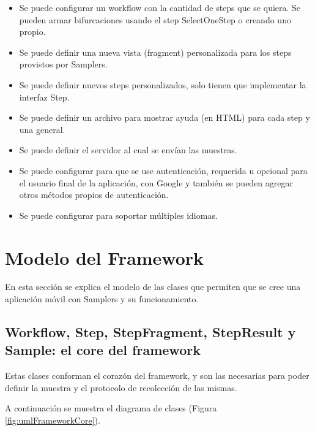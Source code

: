 \begin{itemize}
	\item Se puede configurar un workflow con la cantidad de steps que se quiera. Se pueden armar bifurcaciones usando el step SelectOneStep o creando uno propio.
	\item Se puede definir una nueva vista (fragment) personalizada para los steps provistos por Samplers.
	\item Se puede definir nuevos steps personalizados, solo tienen que implementar la interfaz Step.
	\item Se puede definir un archivo para mostrar ayuda (en HTML) para cada step y una general.
	\item Se puede definir el servidor al cual se envían las muestras.
	\item Se puede configurar para que se use autenticación, requerida u opcional para el usuario final de la aplicación, con Google y también se pueden agregar otros métodos propios de autenticación.
	\item Se puede configurar para soportar múltiples idiomas.
\end{itemize}





\section{Modelo del Framework}
En esta sección se explica el modelo de las clases que permiten que se cree una aplicación móvil con Samplers y su funcionamiento.

\subsection{Workflow, Step, StepFragment, StepResult y Sample: el core del framework}
Estas clases conforman el corazón del framework, y son las necesarias para poder definir la muestra y el protocolo de recolección de las mismas.

A continuación se muestra el diagrama de clases (Figura \ref{fig:umlFrameworkCore}).

